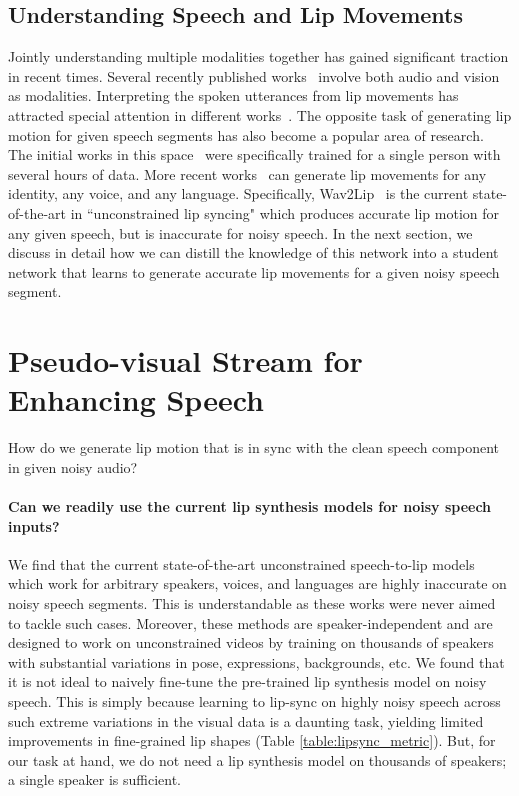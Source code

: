 \documentclass[10pt,twocolumn,letterpaper]{article}
\begin{document}
\subsection{Understanding Speech and Lip Movements}
Jointly understanding multiple modalities together has gained significant traction in recent times. Several recently published works~\cite{Perez_2020_WACV,Wang_2020_WACV,Gao_2018_CVPR_Workshops} involve both audio and vision as modalities. Interpreting the spoken utterances from lip movements has attracted special attention in different works~\cite{Prajwal_2020_CVPR,Afouras18c,Afouras18d,lr1_petridis_2017,lr2_petridis_2017,lr3_petridis_2020}. The opposite task of generating lip motion for given speech segments has also become a popular area of research. The initial works in this space~\cite{Suwajanakorn2017SynthesizingOL,obamanet} were specifically trained for a single person with several hours of data. More recent works~\cite{wav2lip:2020, KR:2019:TAF:3343031.3351066,yst_ijcv_2019} can generate lip movements for any identity, any voice, and any language. Specifically, Wav2Lip~\cite{wav2lip:2020} is the current state-of-the-art in ``unconstrained lip syncing" which produces accurate lip motion for any given speech, but is inaccurate for noisy speech. In the next section, we discuss in detail how we can distill the knowledge of this network into a student network that learns to generate accurate lip movements for a given noisy speech segment.



\section{Pseudo-visual Stream for Enhancing Speech}
\label{section:methodology}
How do we generate lip motion that is in sync with the clean speech component in given noisy audio? 


\paragraph{Can we readily use the current lip synthesis models for noisy speech inputs?} We find that the current state-of-the-art unconstrained speech-to-lip models~\cite{wav2lip:2020, KR:2019:TAF:3343031.3351066,yst_ijcv_2019} which work for arbitrary speakers, voices, and languages are highly inaccurate on noisy speech segments. This is understandable as these works were never aimed to tackle such cases. Moreover, these methods are speaker-independent and are designed to work on unconstrained videos by training on thousands of speakers with substantial variations in pose, expressions, backgrounds, etc. We found that it is not ideal to naively fine-tune the pre-trained lip synthesis model on noisy speech. This is simply because learning to lip-sync on highly noisy speech across such extreme variations in the visual data is a daunting task, yielding limited improvements in fine-grained lip shapes (Table \ref{table:lipsync_metric}). But, for our task at hand, we do not need a lip synthesis model on thousands of speakers; a single speaker is sufficient.
\end{document}

